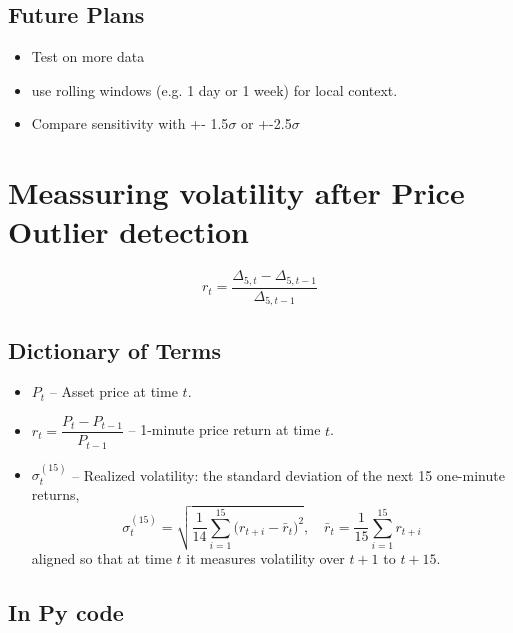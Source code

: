 \documentclass[12pt]{article}
\begin{document}
\subsection*{Future Plans}

\begin{itemize}
    \item Test on more data
    \item use rolling windows (e.g. 1 day or 1 week) for local context.
    \item Compare sensitivity with +- 1.5$\sigma$ or +-2.5$\sigma$
\end{itemize}

\newpage





\section*{Meassuring volatility after Price Outlier detection}


\begin{equation}
    r_t = \frac{\Delta_{5,t} - \Delta_{5,t-1}}{\Delta_{5,t-1}}
\end{equation}

\subsection*{Dictionary of Terms}

\begin{itemize}
    \item $P_t$  
      – Asset price at time $t$.
    \item $r_t = \dfrac{P_t - P_{t-1}}{P_{t-1}}$  
      – 1-minute price return at time $t$.
    \item $\sigma^{\mathrm{(15)}}_{t}$  
      – Realized volatility: the standard deviation of the next 15 one-minute returns,
      \[
        \sigma^{\mathrm{(15)}}_{t}
        = \sqrt{\frac{1}{14}\sum_{i=1}^{15}\bigl(r_{t+i}-\bar r_{t}\bigr)^{2}},
        \quad
        \bar r_{t} = \frac{1}{15}\sum_{i=1}^{15} r_{t+i}
      \]
      aligned so that at time $t$ it measures volatility over $t+1$ to $t+15$.
\end{itemize}



\subsection*{In Py code}
\end{document}
